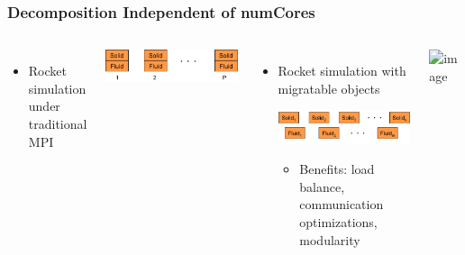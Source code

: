 \begin{frame}[t]
\frametitle{Decomposition Independent of numCores}
  \begin{columns}
    \begin{itemize}
      \item Rocket simulation under traditional MPI
    \end{itemize}
    \begin{center} \includegraphics[width=.6\textwidth]{figures/rocket_mpi} \end{center}
    \pause
    \begin{itemize}
      \item Rocket simulation with migratable objects
      \begin{center} \includegraphics[width=.6\textwidth]{figures/rocket_charm} \end{center}
      \begin{itemize}
        \item Benefits: load balance, communication optimizations, modularity
      \end{itemize}
    \end{itemize}
     {
    \vfill
    \begin{center} \includegraphics<0->[width=\textwidth]{figures/rocket.png} \end{center}
    \vfill
    }
  \end{columns}
\end{frame}
